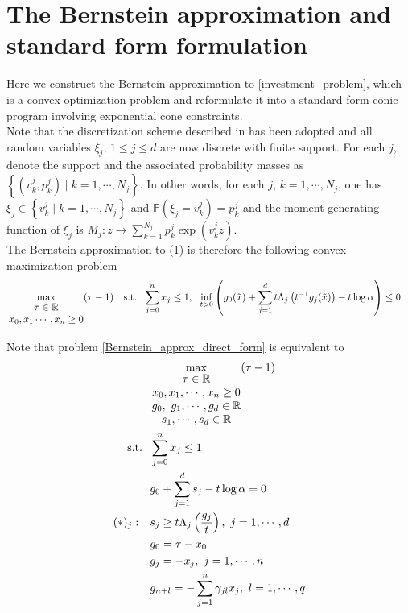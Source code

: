 \documentclass[11pt]{article}
\begin{document}
\section*{The Bernstein approximation and standard form formulation}
Here we construct the Bernstein approximation to \eqref{investment_problem}, which is a convex optimization problem and reformulate it into a standard form conic program involving exponential cone constraints. \\

Note that the discretization scheme described in \cite{Nemirovsky_and_Shapiro} has been adopted and all random variables $\xi_j$, $1\leq j \leq d$ are now discrete with finite support. For each $j$, denote the support and the associated probability masses as $\left\{(v_k^j, p_k^j)\mid k = 1,\cdots, N_j \right\}$. In other words, for each $j$, $k=1, \cdots, N_j$, one has $\xi_j \in \left\{v_k^j \mid k=1,\cdots, N_j \right\}$ and $\mathbb{P}\left(\xi_j = v_k^j\right) = p_k^j$ and the moment generating function of $\xi_j$ is $M_j: z \rightarrow \sum_{k=1}^{N_j} p_k^j \exp \left(v_k^j z\right)$.\\

The Bernstein approximation to (1) is therefore the following convex maximization problem
\begin{align} \label{Bernstein_approx_direct_form}
\begin{split}
&\max_{\begin{matrix}
	\tau \in \mathbb{R}\\ 	
	x_0, x_1\cdots,x_n \geq 0
	\end{matrix}} (\tau - 1)\ \ \
\textnormal{s.t.}\ \ \sum_{j=0}^n x_j \leq 1,\ \ \inf_{t>0} \left(g_0(\tilde{x}) + \sum_{j=1}^d t \Lambda_j\left(t^{-1}g_j(\tilde{x})\right) - t\log \alpha \right) \leq 0
\end{split}
\end{align}

Note that problem \eqref{Bernstein_approx_direct_form} is equivalent to
\begin{align}\label{Bernstein_approx_eq_form_1}
\begin{split}
&\max_{\begin{matrix}
	\tau \in \mathbb{R} \\ 
	x_0, x_1, \cdots, x_n \geq 0\\
	g_0,\ g_1, \cdots, g_d \in \mathbb{R}\\
	s_1, \cdots, s_d \in \mathbb{R}
	\end{matrix}} (\tau - 1)\\ \textnormal{s.t.}\ \ & \sum_{j=0}^n x_j \leq 1\\
&g_0 + \sum_{j=1}^d s_j - t\log \alpha = 0 \\
{(*)_j}:\ \ \ & s_j \geq t \Lambda_j\left(\dfrac{g_j}{t}\right),\ j=1, \cdots, d\ \ \ \\
& g_0 = \tau - x_0 \\
& g_j = -x_j,\ j = 1, \cdots, n \\
& g_{n+l} = -\sum_{j=1}^n \gamma_{jl}x_j,\ l=1,\cdots, q
\end{split}
\end{align}
\end{document}
